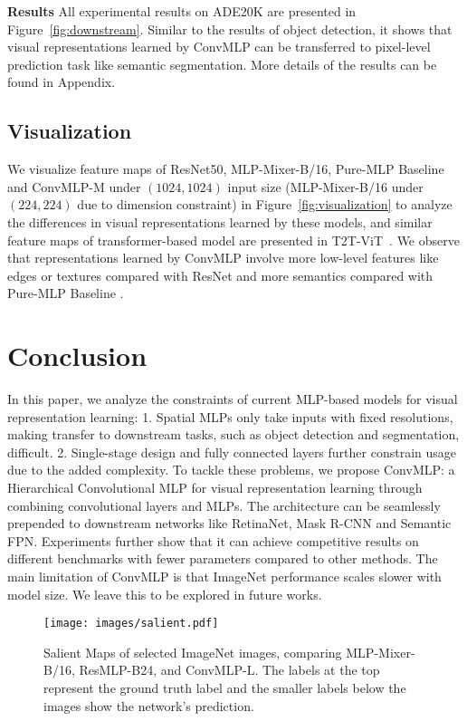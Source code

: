 \documentclass[final]{cvpr}
\begin{document}
\noindent \textbf{Results} All experimental results on ADE20K are presented in Figure~\ref{fig:downstream}. Similar to the results of object detection, it shows that visual representations learned by ConvMLP can be transferred to pixel-level prediction task like semantic segmentation. More details of the results can be found in Appendix.

\subsection{Visualization}
We visualize feature maps of ResNet50, MLP-Mixer-B/16, Pure-MLP Baseline and ConvMLP-M under $(1024, 1024)$ input size (MLP-Mixer-B/16 under $(224,224)$ due to dimension constraint) in Figure~\ref{fig:visualization} to analyze the differences in visual representations learned by these models, and similar feature maps of transformer-based model are presented in T2T-ViT~\cite{yuan2021tokens}. We observe that representations learned by ConvMLP involve more low-level features like edges or textures compared with ResNet and more semantics compared with Pure-MLP Baseline .

\section{Conclusion}
In this paper, we analyze the constraints of current MLP-based models for visual representation learning: 1. Spatial MLPs only take inputs with fixed resolutions, making transfer to downstream tasks, such as object detection and segmentation, difficult. 2. Single-stage design and fully connected layers further constrain usage due to the added complexity. To tackle these problems, we propose ConvMLP: a Hierarchical Convolutional MLP for visual representation learning through combining convolutional layers and MLPs. The architecture can be seamlessly prepended to downstream networks like RetinaNet, Mask R-CNN and Semantic FPN. Experiments further show that it can achieve competitive results on different benchmarks with fewer parameters compared to other methods. 
The main limitation of ConvMLP is that ImageNet performance scales slower with model size. We leave this to be explored in future works.

{\small


}

\appendix

\begin{figure*}[htb]
\centering
\texttt{[image: images/salient.pdf]}
\caption{Salient Maps of selected ImageNet images, comparing MLP-Mixer-B/16, ResMLP-B24, and ConvMLP-L. The labels at the top represent the ground truth label and the smaller labels below the images show the network's prediction.}
\label{fig:salient}
\end{figure*}
\end{document}

